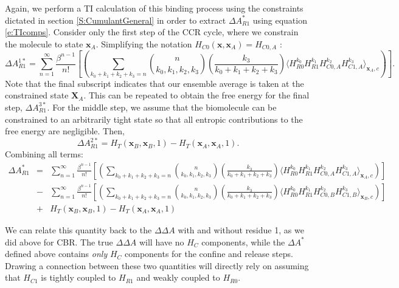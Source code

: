 \documentclass[%
 preprint,
 amsmath,amssymb,
 aps,
]{revtex4-1}
\renewcommand{\vec}[1]{{\bm{#1}}}
\begin{document}
 
 Again,
 we perform a TI calculation of this binding process using the constraints dictated in section \ref{S:CumulantGeneral} in order to extract $\Delta A^*_{R1}$ using equation \ref{e:TIcomps}.  Consider only the first step of the CCR cycle, where we constrain the molecule to state $\vec{x}_A$.  Simplifying the notation $H_{C0}\left( \vec{x},\vec{x}_A  \right) = H_{C0,A}$ : 
 \begin{equation}
\Delta A^{1*}_ {R1}=
\sum_{n=1}^{\infty}  \frac{\beta^{n-1}}{n!} 
\left[
\left(
 \sum_{k_0+k_1+k_2+k_3=n} 
{ n \choose k_0,k_1,k_2,k_3 } \left( \frac{k_3}{k_0+k_1+k_2+k_3} \right) \langle  
H_{R0}^{k_0} H_{R1}^{k_1} H_{C0,A}^{k_2} H_{C1,A}^{k_3} 
\rangle_{\vec{x}_A,c}
\right)
\right].
\label{e:BradyDecomp:CCR1}
\end{equation}
Note that the final subscript indicates that our ensemble average is taken at the constrained state $\vec{X}_A$. 
 This can be repeated to obtain the free energy for the final step, $\Delta A^{3*}_ {R1}$. 
 For the middle step, we assume that the biomolecule can be constrained to an arbitrarily tight state so that all entropic contributions to the free energy are negligible.  Then, 
 \begin{equation}
 \Delta A^{2*}_ {R1}= H_T \left( \vec{x}_B,\vec{x}_B,1 \right) -  H_T \left( \vec{x}_A,\vec{x}_A,1 \right) .
 \label{e:CCREnthalpy}
 \end{equation}
 Combining all terms:
  \begin{eqnarray}
\Delta A^*_ {R1} &=&
\sum_{n=1}^{\infty}  \frac{\beta^{n-1}}{n!} 
\left[
\left(
 \sum_{k_0+k_1+k_2+k_3=n} 
{ n \choose k_0,k_1,k_2,k_3 } \left( \frac{k_3}{k_0+k_1+k_2+k_3} \right) \langle  
H_{R0}^{k_0} H_{R1}^{k_1} H_{C0,A}^{k_2} H_{C1,A}^{k_3} 
\rangle_{\vec{x}_A,c}
\right)
\right] \nonumber \\ 
& - &
\sum_{n=1}^{\infty}  \frac{\beta^{n-1}}{n!} 
\left[
\left(
 \sum_{k_0+k_1+k_2+k_3=n} 
{ n \choose k_0,k_1,k_2,k_3 } \left( \frac{k_3}{k_0+k_1+k_2+k_3} \right) \langle  
H_{R0}^{k_0} H_{R1}^{k_1} H_{C0,B}^{k_2} H_{C1,B}^{k_3} 
\rangle_{\vec{x}_B,c}
\right)
\right] \nonumber \\ 
& + &
H_T \left( \vec{x}_B,\vec{x}_B,1 \right) -  H_T \left( \vec{x}_A,\vec{x}_A,1 \right) 
\label{e:BradyTotal:CCR}
\end{eqnarray}
 
 We can relate this quantity back to the $\Delta \Delta A$ with and without residue 1, as we did above for CBR.  The true $\Delta \Delta A$ will have no $H_C$ components, while the $\Delta A^*$ defined above contains \emph{only} $H_C$ components for the confine and release steps.  
 Drawing a connection between these two quantities will directly rely on assuming that $H_{C1}$ is tightly coupled to 
  $H_{R1}$ and weakly coupled to  $H_{R0}$. 
 
\end{document}
